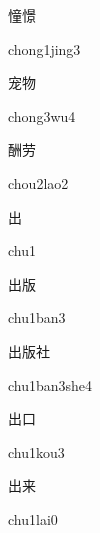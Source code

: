 \begin{verbete}{憧憬}
\begin{pronuncia}{chong1jing3}
\end{pronuncia}
\end{verbete}

\begin{verbete}[chong3wu4]{宠物}
\begin{pronuncia}{chong3wu4}
\end{pronuncia}
\end{verbete}

\begin{verbete}{酬劳}
\begin{pronuncia}{chou2lao2}
\end{pronuncia}
\end{verbete}

\begin{verbete}[chu1]{出}
\begin{pronuncia}{chu1}
\end{pronuncia}
\end{verbete}

\begin{verbete}{出版}
\begin{pronuncia}{chu1ban3}
\end{pronuncia}
\end{verbete}

\begin{verbete}{出版社}
\begin{pronuncia}{chu1ban3she4}
\end{pronuncia}
\end{verbete}

\begin{verbete}{出口}
\begin{pronuncia}{chu1kou3}
\end{pronuncia}
\end{verbete}

\begin{verbete}[chu1qu0]{出来}
\begin{pronuncia}{chu1lai0}
\end{pronuncia}
\end{verbete}

